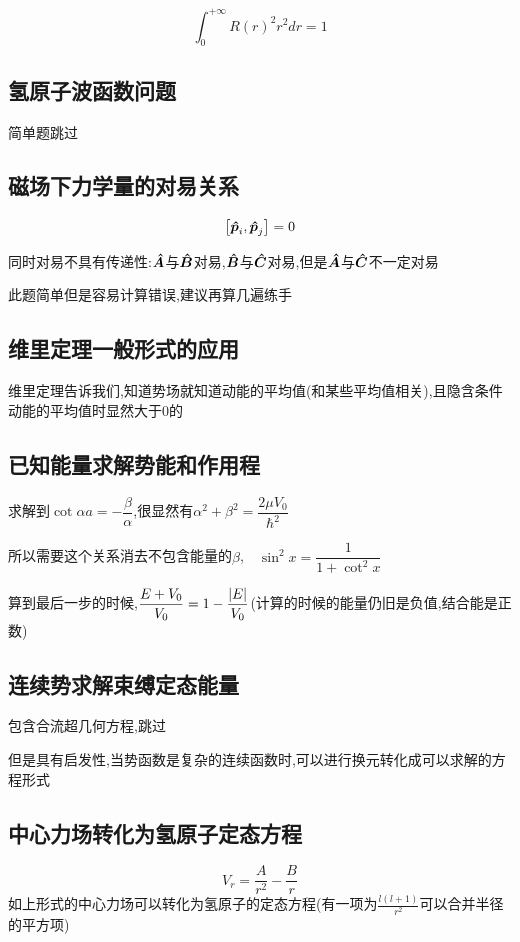 \documentclass{article}
\begin{document}
            $$ \int_{0}^{+\infty} R(r)^{2}r^{2}dr = 1 $$

        \subsection{氢原子波函数问题}
            简单题跳过
        
        \subsection{磁场下力学量的对易关系}
            $$ \comm{\vu*{p}_{i}}{\vu*{p}_{j}} = 0 $$

            同时对易不具有传递性:$ \vu*{A} $与$ \vu*{B} $对易,$ \vu*{B} $与$ \vu*{C} $对易,但是$ \vu*{A} $与$ \vu*{C} $不一定对易

            此题简单但是容易计算错误,建议再算几遍练手

        \subsection{维里定理一般形式的应用}
            维里定理告诉我们,知道势场就知道动能的平均值(和某些平均值相关),且隐含条件动能的平均值时显然大于0的

        \subsection{已知能量求解势能和作用程}
            求解到$ \cot{\alpha a} = - \dfrac{\beta}{\alpha} $,很显然有$ \alpha^{2} + \beta^{2} = \dfrac{2\mu V_{0}}{\hbar^{2}}  $
            
            所以需要这个关系消去不包含能量的$\beta$,$ \quad \sin^{2}{x} = \dfrac{1}{1 + \cot^{2}{x}} $

            算到最后一步的时候,$ \dfrac{E+V_{0}}{V_{0}} = 1 - \dfrac{\abs{E}}{V_{0}} $(计算的时候的能量仍旧是负值,结合能是正数)

        \subsection{连续势求解束缚定态能量}
            包含合流超几何方程,跳过
            
            但是具有启发性,当势函数是复杂的连续函数时,可以进行换元转化成可以求解的方程形式
            
        \subsection{中心力场转化为氢原子定态方程}
        $$ V_{r} = \frac{A}{r^{2}} - \frac{B}{r} $$
        如上形式的中心力场可以转化为氢原子的定态方程(有一项为$\frac{l(l+1)}{r^{2}}$可以合并半径的平方项)
\end{document}
